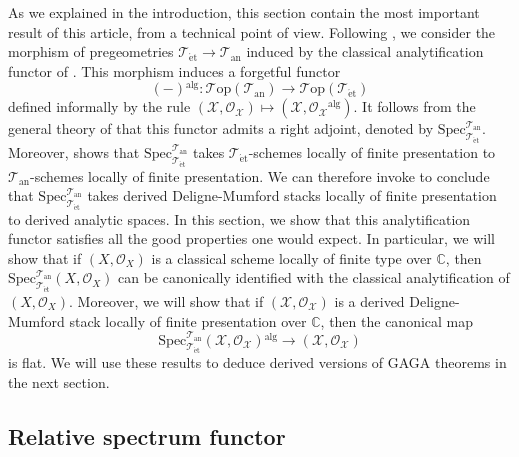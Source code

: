 \documentclass[12pt,a4paper,reqno]{amsart}
\theoremstyle{plain}
\theoremstyle{definition}
\theoremstyle{remark}
\numberwithin{equation}{section}
\begin{document}
As we explained in the introduction, this section contain the most important result of this article, from a technical point of view.
Following \cite[Remark 12.26]{DAG-IX}, we consider the morphism of pregeometries ${{\mathcal T}_{\mathrm{\acute{e}t}}} \to {{\mathcal T}_{\mathrm{an}}}$ induced by the classical analytification functor of \cite[Expos\'e XII]{SGA1}.
This morphism induces a forgetful functor
\[ (-){^\mathrm{alg}} \colon {\mathcal T\mathrm{op}}({{\mathcal T}_{\mathrm{an}}}) \to {\mathcal T\mathrm{op}}({{\mathcal T}_{\mathrm{\acute{e}t}}}) \]
defined informally by the rule $({\mathcal X}, {\mathcal O}_{\mathcal X}) \mapsto ({\mathcal X}, {\mathcal O}_{\mathcal X}{^\mathrm{alg}})$.
It follows from the general theory of \cite[Â§2.1]{DAG-V} that this functor admits a right adjoint, denoted by $\mathrm{Spec}^{{\mathcal T}_{\mathrm{an}}}_{{\mathcal T}_{\mathrm{\acute{e}t}}}$.
Moreover, \cite[Proposition 2.3.18]{DAG-V} shows that $\mathrm{Spec}^{{\mathcal T}_{\mathrm{an}}}_{{\mathcal T}_{\mathrm{\acute{e}t}}}$ takes ${{\mathcal T}_{\mathrm{\acute{e}t}}}$-schemes locally of finite presentation to ${{\mathcal T}_{\mathrm{an}}}$-schemes locally of finite presentation. We can therefore invoke \cite[Corollary 12.22]{DAG-IX} to conclude that $\mathrm{Spec}^{{\mathcal T}_{\mathrm{an}}}_{{\mathcal T}_{\mathrm{\acute{e}t}}}$ takes derived Deligne-Mumford stacks locally of finite presentation to derived analytic spaces.
In this section, we show that this analytification functor satisfies all the good properties one would expect.
In particular, we will show that if $(X, {\mathcal O}_X)$ is a classical scheme locally of finite type over $\mathbb C$, then $\mathrm{Spec}^{{\mathcal T}_{\mathrm{an}}}_{{\mathcal T}_{\mathrm{\acute{e}t}}}(X, {\mathcal O}_X)$ can be canonically identified with the classical analytification of $(X, {\mathcal O}_X)$.
Moreover, we will show that if $({\mathcal X}, {\mathcal O}_{\mathcal X})$ is a derived {Deligne-Mumford\xspace} stack locally of finite presentation over $\mathbb C$, then the canonical map
\[ \mathrm{Spec}^{{\mathcal T}_{\mathrm{an}}}_{{\mathcal T}_{\mathrm{\acute{e}t}}}({\mathcal X}, {\mathcal O}_{\mathcal X}){^\mathrm{alg}} \to ({\mathcal X}, {\mathcal O}_{\mathcal X}) \]
is flat.
We will use these results to deduce derived versions of GAGA theorems in the next section.

\subsection{Relative spectrum functor}
\end{document}

